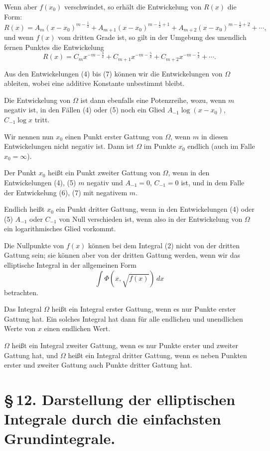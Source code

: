 \documentclass[11pt]{article}
\begin{document}
Wenn aber $f(x_0)$ verschwindet, so erhält die Entwickelung von $R(x)$ die Form:
\begin{equation}
R(x)=A_m(x-x_0)^{m-\frac12}+A_{m+1}(x-x_0)^{m-\frac12+1}
+A_{m+2}(x-x_0)^{m-\frac12+2}+\cdots,
\tag{6}
\end{equation}
und wenn $f(x)$ vom dritten Grade ist, so gilt in der Umgebung des unendlich fernen Punktes die Entwickelung
\begin{equation}
R(x)=C_mx^{-m-\frac32}+C_{m+1}x^{-m-\frac52}
+C_{m+2}x^{-m-\frac72}+\cdots.
\tag{7}
\end{equation}

Aus den Entwickelungen (4) bis (7) können wir die Entwickelungen von $\Omega$ ableiten, wobei eine additive Konstante unbestimmt bleibt.

Die Entwickelung von $\Omega$ ist dann ebenfalls eine Potenzreihe, wozu, wenn $m$ negativ ist, in den Fällen (4) oder (5) noch ein Glied $A_{-1}\log(x-x_0)$, $C_{-1}\log x$ tritt.

Wir nennen nun $x_0$ einen Punkt erster Gattung von $\Omega$, wenn $m$ in diesen Entwickelungen nicht negativ ist. Dann ist $\Omega$ im Punkte $x_0$ endlich (auch im Falle $x_0=\infty$).

Der Punkt $x_0$ heißt ein Punkt zweiter Gattung von $\Omega$, wenn in den Entwickelungen (4), (5) $m$ negativ und $A_{-1}=0$, $C_{-1}=0$ ist, und in dem Falle der Entwickelung (6), (7) mit negativem $m$.

Endlich heißt $x_0$ ein Punkt dritter Gattung, wenn in den Entwickelungen (4) oder (5) $A_{-1}$ oder $C_{-1}$ von Null verschieden ist, wenn also in der Entwickelung von $\Omega$ ein logarithmisches Glied vorkommt.

Die Nullpunkte von $f(x)$ können bei dem Integral (2) nicht von der dritten Gattung sein; sie können aber von der dritten Gattung werden, wenn wir das elliptische Integral in der allgemeinen Form
\[
\int\Phi(x,\sqrt{f(x)})\,dx
\]
betrachten.

Das Integral $\Omega$ heißt ein Integral erster Gattung, wenn es nur Punkte erster Gattung hat. Ein solches Integral hat dann für alle endlichen und unendlichen Werte von $x$ einen endlichen Wert.

$\Omega$ heißt ein Integral zweiter Gattung, wenn es nur Punkte erster und zweiter Gattung hat, und $\Omega$ heißt ein Integral dritter Gattung, wenn es neben Punkten erster und zweiter Gattung auch Punkte dritter Gattung hat.

\section*{\S\,12. Darstellung der elliptischen Integrale durch die einfachsten Grundintegrale.}
\end{document}
